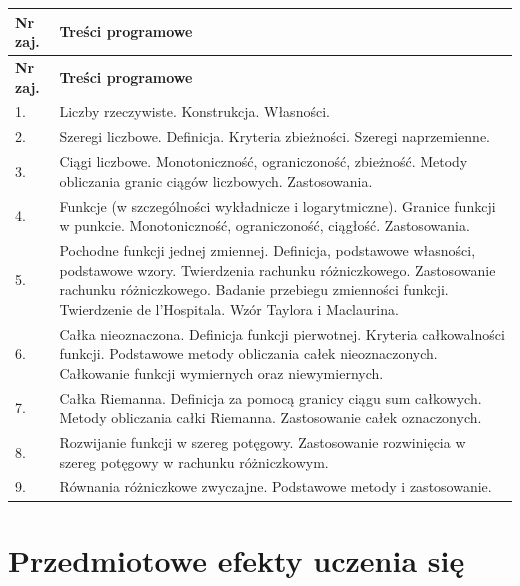 \documentclass[12pt, a4paper]{article}
\newcommand{\thdrule}{\noalign{\global\setlength{\extrarowheight}{0pt}}}
\newcommand{\thdend}{\noalign{\global\setlength{\extrarowheight}{3pt}}}
\begin{document}
{\scriptsize
\begin{longtable}{m{1.5cm}m{14.5cm}}
\thdrule\toprule
\rowcolor{pjatkRed} {\color{white}\textbf{Nr zaj.}} & {\color{white}\textbf{Treści programowe}} \\
\midrule\thdend
\endfirsthead
\thdrule\toprule
\rowcolor{pjatkRed} {\color{white}\textbf{Nr zaj.}} & {\color{white}\textbf{Treści programowe}} \\
\midrule\thdend
\endhead
  \rowcolor{tableRowLight} 1. & Liczby rzeczywiste. Konstrukcja. Własności. \\
  \rowcolor{tableRowAlt} 2. & Szeregi liczbowe. Definicja. Kryteria zbieżności. Szeregi naprzemienne. \\
  \rowcolor{tableRowLight} 3. & Ciągi liczbowe. Monotoniczność, ograniczoność, zbieżność. Metody obliczania granic ciągów liczbowych. Zastosowania. \\
  \rowcolor{tableRowAlt} 4. & Funkcje (w szczególności wykładnicze i logarytmiczne).  Granice funkcji w punkcie. Monotoniczność, ograniczoność, ciągłość. Zastosowania. \\
  \rowcolor{tableRowLight} 5. & Pochodne funkcji jednej zmiennej. Definicja, podstawowe własności, podstawowe wzory.  Twierdzenia rachunku różniczkowego. Zastosowanie rachunku różniczkowego. Badanie przebiegu zmienności funkcji. Twierdzenie de l’Hospitala.  Wzór Taylora i Maclaurina. \\
  \rowcolor{tableRowAlt} 6. & Całka nieoznaczona. Definicja funkcji pierwotnej. Kryteria całkowalności funkcji. Podstawowe metody obliczania całek nieoznaczonych. Całkowanie funkcji wymiernych oraz niewymiernych. \\
  \rowcolor{tableRowLight} 7. & Całka Riemanna. Definicja za pomocą granicy ciągu sum całkowych. Metody obliczania całki Riemanna. Zastosowanie całek oznaczonych. \\
  \rowcolor{tableRowAlt} 8. & Rozwijanie funkcji w szereg potęgowy. Zastosowanie rozwinięcia w szereg potęgowy w rachunku różniczkowym. \\
  \rowcolor{tableRowLight} 9. & Równania różniczkowe zwyczajne. Podstawowe metody i zastosowanie. \\
\bottomrule
\end{longtable}}

\section{Przedmiotowe efekty uczenia się}
\end{document}
